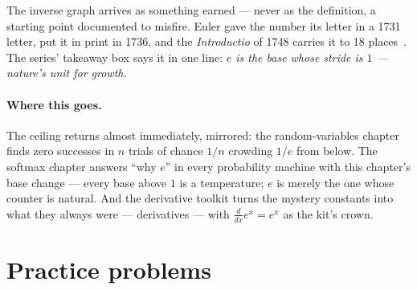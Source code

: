 \begin{narrative}
\begin{center}
\end{center}

The inverse graph arrives as something earned — never as the
definition, a starting point documented to misfire. Euler gave the
number its letter in a 1731 letter, put it in print in 1736, and the
\emph{Introductio} of 1748 carries it to 18
places~\cite{calculus-j-j-o-connor-and-e-f-robertson-the-number-e-mactutor}.
The series' takeaway box says it in one line: \emph{$e$ is the base
whose stride is $1$ — nature's unit for growth.}

\paragraph{Where this goes.} The ceiling returns almost immediately,
mirrored: the random-variables chapter finds zero successes in $n$
trials of chance $1/n$ crowding $1/e$ from below. The softmax chapter
answers ``why $e$'' in every probability machine with this chapter's
base change — every base above $1$ is a temperature; $e$ is merely the
one whose counter is natural. And the derivative toolkit turns the
mystery constants into what they always were — derivatives — with
$\tfrac{d}{dx} e^x = e^x$ as the kit's crown.
\end{narrative}

\section*{Practice problems}


